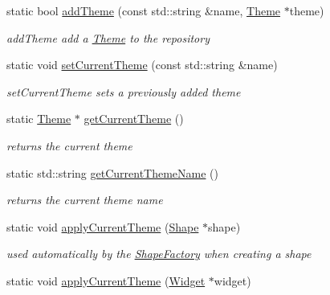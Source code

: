 \begin{DoxyCompactItemize}
\item 
static bool \hyperlink{classcanvascv_1_1ThemeRepository_ac4c17001de8990373066ee3cc9c8a167}{add\+Theme} (const std\+::string \&name, \hyperlink{classcanvascv_1_1Theme}{Theme} $\ast$theme)
\begin{DoxyCompactList}\small\item\em add\+Theme add a \hyperlink{classcanvascv_1_1Theme}{Theme} to the repository \end{DoxyCompactList}\item 
static void \hyperlink{classcanvascv_1_1ThemeRepository_a0adfc9060f4c9f274e3be5800b952a8f}{set\+Current\+Theme} (const std\+::string \&name)
\begin{DoxyCompactList}\small\item\em set\+Current\+Theme sets a previously added theme \end{DoxyCompactList}\item 
static \hyperlink{classcanvascv_1_1Theme}{Theme} $\ast$ \hyperlink{classcanvascv_1_1ThemeRepository_af63c1f2e5bac4f6adbaa328234aa476d}{get\+Current\+Theme} ()\hypertarget{classcanvascv_1_1ThemeRepository_af63c1f2e5bac4f6adbaa328234aa476d}{}\label{classcanvascv_1_1ThemeRepository_af63c1f2e5bac4f6adbaa328234aa476d}

\begin{DoxyCompactList}\small\item\em returns the current theme \end{DoxyCompactList}\item 
static std\+::string \hyperlink{classcanvascv_1_1ThemeRepository_a5cbfe3483cb442b3317f2d6dff983966}{get\+Current\+Theme\+Name} ()\hypertarget{classcanvascv_1_1ThemeRepository_a5cbfe3483cb442b3317f2d6dff983966}{}\label{classcanvascv_1_1ThemeRepository_a5cbfe3483cb442b3317f2d6dff983966}

\begin{DoxyCompactList}\small\item\em returns the current theme name \end{DoxyCompactList}\item 
static void \hyperlink{classcanvascv_1_1ThemeRepository_af64bf9462b980772c4c8c11132edec26}{apply\+Current\+Theme} (\hyperlink{classcanvascv_1_1Shape}{Shape} $\ast$shape)\hypertarget{classcanvascv_1_1ThemeRepository_af64bf9462b980772c4c8c11132edec26}{}\label{classcanvascv_1_1ThemeRepository_af64bf9462b980772c4c8c11132edec26}

\begin{DoxyCompactList}\small\item\em used automatically by the \hyperlink{classcanvascv_1_1ShapeFactory}{Shape\+Factory} when creating a shape \end{DoxyCompactList}\item 
static void \hyperlink{classcanvascv_1_1ThemeRepository_a92d582b9eef45fabdd2ff6dc354250cf}{apply\+Current\+Theme} (\hyperlink{classcanvascv_1_1Widget}{Widget} $\ast$widget)\hypertarget{classcanvascv_1_1ThemeRepository_a92d582b9eef45fabdd2ff6dc354250cf}{}\label{classcanvascv_1_1ThemeRepository_a92d582b9eef45fabdd2ff6dc354250cf}


\end{DoxyCompactItemize}
